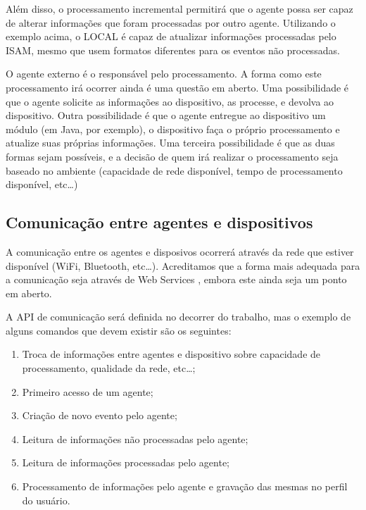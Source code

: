 \documentclass[a4paper, twocolumn]{article}
\begin{document}
Além disso, o processamento incremental permitirá que o agente possa ser capaz de alterar informações que foram processadas por outro agente. Utilizando o exemplo acima, o LOCAL é capaz de atualizar informações processadas pelo ISAM, mesmo que usem formatos diferentes para os eventos não processadas.

O agente externo é o responsável pelo processamento. A forma como este processamento irá ocorrer ainda é uma questão em aberto. Uma possibilidade é que o agente solicite as informações ao dispositivo, as processe, e devolva ao dispositivo. Outra possibilidade é que o agente entregue ao dispositivo um módulo (em Java, por exemplo), o dispositivo faça o próprio processamento e atualize suas próprias informações. Uma terceira possibilidade é que as duas formas sejam possíveis, e a decisão de quem irá realizar o processamento seja baseado no ambiente (capacidade de rede disponível, tempo de processamento disponível, etc\ldots)


\subsection{Comunicação entre agentes e dispositivos} \label{sec:comunicacao}

A comunicação entre os agentes e disposivos ocorrerá através da rede que estiver disponível (WiFi, Bluetooth, etc\ldots). Acreditamos que a forma mais adequada para a comunicação seja através de Web Services \cite{??}, embora este ainda seja um ponto em aberto.

A API de comunicação será definida no decorrer do trabalho, mas o exemplo de alguns comandos que devem existir são os seguintes:

\begin{enumerate}
  \item Troca de informações entre agentes e dispositivo sobre capacidade de processamento, qualidade da rede, etc\dots;
  \item Primeiro acesso de um agente;
  \item Criação de novo evento pelo agente;
  \item Leitura de informações não processadas pelo agente;
  \item Leitura de informações processadas pelo agente;
  \item Processamento de informações pelo agente e gravação das mesmas no perfil do usuário.
\end{enumerate}
\end{document}
